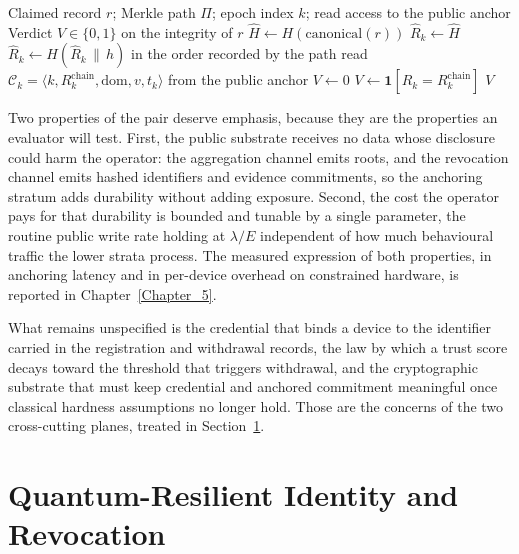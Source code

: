 \begin{algorithm}[t]
\caption{Independent verification of an anchored record}
\label{alg:strata-verify}
\begin{algorithmic}[1]
\Require Claimed record $r$; Merkle path $\Pi$; epoch index $k$; read access to the public anchor
\Ensure Verdict $V \in \{0,1\}$ on the integrity of $r$
\State $\hat{H} \gets H(\mathrm{canonical}(r))$ 
\State $\hat{R}_k \gets \hat{H}$
  \State $\hat{R}_k \gets H(\hat{R}_k \,\|\, h)$ in the order recorded by the path
\EndFor
\State read $\mathcal{C}_k = \langle k, R_k^{\mathrm{chain}}, \mathrm{dom}, v, t_k \rangle$ from the public anchor
  \State \Return $V \gets 0$ 
\EndIf
\State $V \gets \mathbf{1}[\hat{R}_k = R_k^{\mathrm{chain}}]$
\State \Return $V$
\end{algorithmic}
\end{algorithm}

Two properties of the pair deserve emphasis, because they are the properties an evaluator will test. First, the public substrate receives no data whose disclosure could harm the operator: the aggregation channel emits roots, and the revocation channel emits hashed identifiers and evidence commitments, so the anchoring stratum adds durability without adding exposure. Second, the cost the operator pays for that durability is bounded and tunable by a single parameter, the routine public write rate holding at $\lambda/E$ independent of how much behavioural traffic the lower strata process. The measured expression of both properties, in anchoring latency and in per-device overhead on constrained hardware, is reported in Chapter~\ref{Chapter_5}.

What remains unspecified is the credential that binds a device to the identifier carried in the registration and withdrawal records, the law by which a trust score decays toward the threshold that triggers withdrawal, and the cryptographic substrate that must keep credential and anchored commitment meaningful once classical hardness assumptions no longer hold. Those are the concerns of the two cross-cutting planes, treated in Section~\ref{sec:strata-identity}.


\section{Quantum-Resilient Identity and Revocation}
\label{sec:strata-identity}

